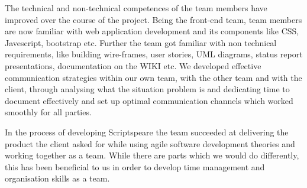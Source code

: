 \documentclass{l3proj}
\begin{document}
The technical and non-technical competences of the team members have improved over the course of the project. Being the front-end team, team members are now familiar with web application development and its components like CSS, Javescript, bootstrap etc. Further the team got familiar with non technical  requirements, like building wire-frames, user stories, UML diagrams, status report presentations, documentation on the WIKI etc. We developed effective communication strategies within our own team, with the other team and with the client, through analysing what the situation problem is and dedicating time to document effectively and set up optimal communication channels which worked smoothly for all parties.

In the process of developing Scriptspeare the team succeeded at delivering the product the client asked for while using agile software development theories and working together as a team.  While there are parts which we would do differently, this has been beneficial to us in order to develop time management and organisation skills as a team.




\end{document}
